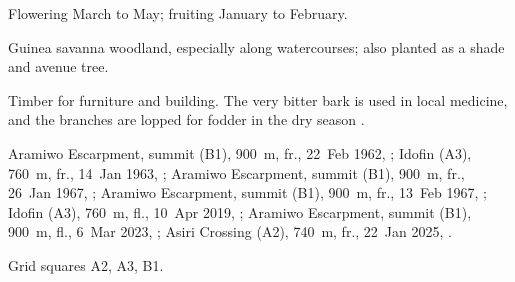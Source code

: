  Flowering March to May; fruiting January to
February.

 Guinea savanna woodland, especially along
watercourses; also planted as a shade and avenue tree.

 Timber for furniture and building. The very bitter bark
is used in local medicine, and the branches are lopped for fodder in
the dry season \citep{arbonnier2004,orwa2009}.

 Aramiwo Escarpment, summit (B1), 900~m, fr., 22~Feb 1962, ;
Idofin (A3), 760~m, fr., 14~Jan 1963, ;
Aramiwo Escarpment, summit (B1), 900~m, fr., 26~Jan 1967, ;
Aramiwo Escarpment, summit (B1), 900~m, fr., 13~Feb 1967, ;
Idofin (A3), 760~m, fl., 10~Apr 2019, ;
Aramiwo Escarpment, summit (B1), 900~m, fl., 6~Mar 2023, ;
Asiri Crossing (A2), 740~m, fr., 22~Jan 2025, .

 Grid squares A2, A3, B1.

\begin{center}
\end{center}

